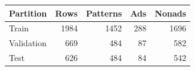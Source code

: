 \begin{tabular}{lrrrr}\toprule
Partition & Rows & Patterns & Ads & Nonads\\\midrule
Train & 1984 & 1452 & 288 & 1696\\
Validation & 669 & 484 & 87 & 582\\
Test & 626 & 484 & 84 & 542\\
\bottomrule\end{tabular}
